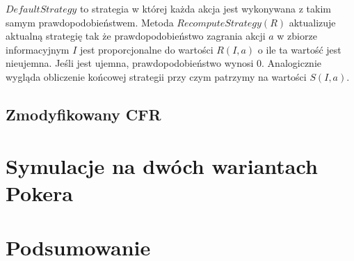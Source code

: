 \documentclass[licencjacka]{pracamgr}
\begin{document}
$\,$ \\
\noindent
$DefaultStrategy$ to strategia w której każda akcja jest wykonywana z takim samym prawdopodobieństwem. Metoda
$RecomputeStrategy(R)$ aktualizuje aktualną strategię tak że prawdopodobieństwo zagrania akcji $a$ w zbiorze informacyjnym
$I$ jest proporcjonalne do wartości $R(I, a)$ o ile ta wartość jest nieujemna. Jeśli jest ujemna, prawdopodobieństwo
wynosi $0$. Analogicznie wygląda obliczenie końcowej strategii przy czym patrzymy na wartości $S(I, a)$.

\section{Zmodyfikowany CFR}

\chapter{Symulacje na dwóch wariantach Pokera}

\chapter{Podsumowanie}
\end{document}
